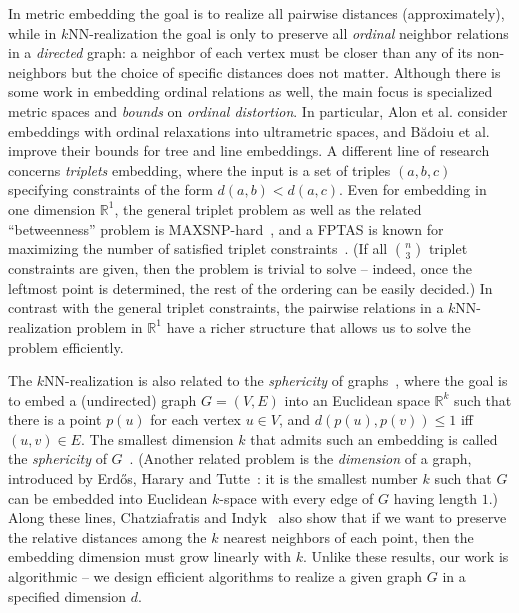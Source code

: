 \documentclass[english]{lipics-v2021}
\begin{document}
In metric embedding the goal is to realize all pairwise distances (approximately), while in $k$NN-realization the goal is only to preserve all \emph{ordinal} neighbor relations in a \emph{directed} graph: a neighbor of each vertex must be closer than any of its non-neighbors but the choice of specific distances does not matter.
Although  there is some work in embedding ordinal relations as well, the main focus is specialized metric spaces and \emph{bounds} on \emph{ordinal distortion}.
In particular, Alon et al. \cite{alon2008} consider embeddings with ordinal relaxations into ultrametric spaces, and Bădoiu et al. \cite{badoiu2008} improve their bounds for tree and line embeddings.
A different line of research concerns \emph{triplets} embedding, where the input is a set of triples $(a, b, c)$ specifying constraints of the form $d(a, b) < d(a, c)$.
Even for embedding in one dimension $\mathbb{R}^1$, the general triplet problem as well as the related ``betweenness'' problem is MAXSNP-hard~\cite{ChorSudan}, and a FPTAS is known for maximizing the number of satisfied triplet constraints~\cite{fan2020}.
(If all $\binom{n}{3}$ triplet constraints are given, then the problem is trivial to solve -- indeed, once the leftmost point is determined, the rest of the ordering can be easily decided.)
In contrast with the general triplet constraints, the pairwise relations in a $k$NN-realization problem in $\mathbb{R}^1$ have a richer structure that allows us to solve the problem efficiently. 

The $k$NN-realization is also related to the \emph{sphericity} of graphs~\cite{maehara:1984}, where the goal is to embed a (undirected) graph $G=(V,E)$ into an Euclidean space $\mathbb{R}^k$ such that there is a point $p(u)$ for each vertex $u \in V$, and $d(p(u), p(v)) \leq 1$ iff $(u, v) \in E$.  The smallest dimension $k$ that admits such an embedding is called the \emph{sphericity} of $G$~\cite{maehara:1984}. (Another related problem is the \emph{dimension} of a graph, introduced by Erd\H{o}s, Harary and Tutte~\cite{erdos:65}: it is the smallest number $k$ such that $G$ can be embedded into Euclidean $k$-space with every edge of $G$ having length $1$.) Along these lines, Chatziafratis and Indyk~\cite{chatziafratis2024} also show that if we want to preserve the relative distances among the $k$ nearest neighbors of each point, then the embedding dimension must grow linearly with $k$. Unlike these results, our work is algorithmic -- we design efficient algorithms to realize a given graph $G$ in a specified dimension $d$.
\end{document}
